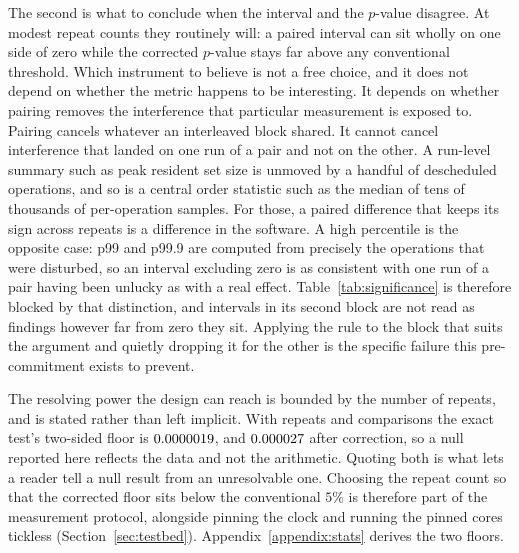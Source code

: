 \documentclass[english,oneside,a4paper,censored,csm,software-track-2020]{HYthesisML}
\begin{document}
The second is what to conclude when the interval and the $p$-value disagree. At modest repeat
counts they routinely will: a paired interval can sit wholly on one side of zero while the
corrected $p$-value stays far above any conventional threshold. Which instrument to believe
is not a free choice, and it does not depend on whether the metric happens to be interesting. It
depends on whether pairing removes the interference that particular measurement is exposed to.
Pairing cancels whatever an interleaved block shared. It cannot cancel interference that landed
on one run of a pair and not on the other. A run-level summary such as peak resident set size is
unmoved by a handful of descheduled operations, and so is a central order statistic such as the
median of tens of thousands of per-operation samples. For those, a paired difference that keeps
its sign across repeats is a difference in the software. A high percentile is the
opposite case: p99 and p99.9 are computed from precisely the operations that were disturbed, so
an interval excluding zero is as consistent with one run of a pair having been unlucky as with a
real effect. Table~\ref{tab:significance} is therefore blocked by that distinction, and
intervals in its second block are not read as findings however far from zero they sit. Applying
the rule to the block that suits the argument and quietly dropping it for the other is the
specific failure this pre-commitment exists to prevent.

The resolving power the design can reach is bounded by the number of repeats, and is stated
rather than left implicit. With \NRepeats{} repeats and \NTests{} comparisons the exact test's
two-sided floor is $0.0000019$, and $0.000027$ after correction, so a null reported
here reflects the data and not the arithmetic. Quoting both is what lets a reader tell a null
result from an unresolvable one. Choosing the repeat count so that the corrected floor sits below
the conventional $5\%$ is therefore part of the measurement protocol, alongside pinning the clock
and running the pinned cores tickless (Section~\ref{sec:testbed}).
Appendix~\ref{appendix:stats} derives the two floors.
\end{document}
